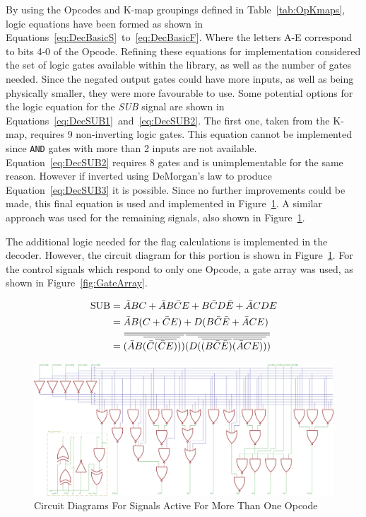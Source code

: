 By using the Opcodes and K-map groupings defined in Table~\ref{tab:OpKmaps}, logic equations have been formed as shown in Equations~\eqref{eq:DecBasicS}~to~\eqref{eq:DecBasicF}. 
Where the letters A-E correspond to bits 4-0 of the Opcode. 
Refining these equations for implementation considered the set of logic gates available within the library, as well as the number of gates needed. 
Since the negated output gates could have more inputs, as well as being physically smaller, they were more favourable to use. 
Some potential options for the logic equation for the \textit{SUB} signal are shown in Equations~\eqref{eq:DecSUB1}~and~\eqref{eq:DecSUB2}. 
The first one, taken from the K-map, requires 9 non-inverting logic gates. 
This equation cannot be implemented since \texttt{AND} gates with more than 2 inputs are not available. 
Equation~\eqref{eq:DecSUB2} requires 8 gates and is unimplementable for the same reason. 
However if inverted using DeMorgan's law to produce Equation~\eqref{eq:DecSUB3} it is possible.
Since no further improvements could be made, this final equation is used and implemented in Figure~\ref{fig:DecMultiCirs}. A similar approach was used for the remaining signals, also shown in Figure~\ref{fig:DecMultiCirs}. 

The additional logic needed for the flag calculations is implemented in the decoder. 
However, the circuit diagram for this portion is shown in Figure~\ref{fig:DecMultiCirs}. 
For the control signals which respond to only one Opcode, a gate array was used, as shown in Figure~\ref{fig:GateArray}. 

\newcommand{\overbar}[1]{\mkern 1.5mu\overline{\mkern-1.5mu#1\mkern-1.5mu}\mkern 1.5mu}
\begin{align}
	\text{SUB} &= \bar{A}BC + \bar{A}B\bar{C}E + B\bar{C}D\bar{E} + \bar{A}CDE \label{eq:DecSUB1}\\
	&= \bar{A}B(C + \bar{C}E) + D(B\bar{C}\bar{E} + \bar{A}CE) \label{eq:DecSUB2}\\
	&= \overbar{\overbar{(\bar{A}B\overbar{(\bar{C}\overbar{(\bar{C}E)})})}\overbar{(D\overbar{(\overbar{(B\bar{C}\bar{E})}\overbar{(\bar{A}CE)})})}} \label{eq:DecSUB3}
\end{align}

\begin{figure}[h!]
	\centering
	\includegraphics[width=\textwidth]{Figures/ALUDecoderMore1v2.png}
	\caption{Circuit Diagrams For Signals Active For More Than One Opcode}
	\label{fig:DecMultiCirs}
\end{figure}


